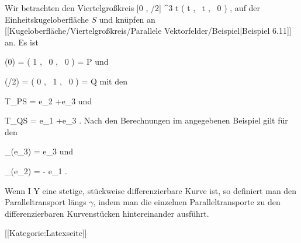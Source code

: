 {

Wir betrachten den Viertelgroßkreis
\maabbeledisp {} {[0 , \pi/2] } { \R^3
} { t } { \left(  \cos  t   , \,   \sin  t  , \,   0                 \right)
} {,}
auf der Einheitskugeloberfläche $S$ und knüpfen an
[[Kugeloberfläche/Viertelgroßkreis/Parallele Vektorfelder/Beispiel|Beispiel 6.11]]
an. Es ist

\mavergleichskette
{\vergleichskette
{ \gamma(0)
}
{ = }{ \left(  1   , \,   0  , \,   0                 \right)
}
{ = }{ P
}
{    }{
}
{   }{
}
}
{}{}{}
und

\mavergleichskette
{\vergleichskette
{ \gamma(\pi/2)
}
{ = }{ \left(  0   , \,   1  , \,   0                 \right)
}
{ = }{ Q
}
{    }{
}
{   }{
}
}
{}{}{}
mit den

\mavergleichskette
{\vergleichskette
{ T_PS
}
{ = }{ \R e_2 +\R e_3
}
{  }{
}
{    }{
}
{   }{
}
}
{}{}{}
und

\mavergleichskette
{\vergleichskette
{ T_QS
}
{ = }{ \R e_1 +\R e_3
}
{  }{
}
{    }{
}
{   }{
}
}
{}{}{.}
Nach den Berechnungen im angegebenen Beispiel gilt für den

\mavergleichskette
{\vergleichskette
{ \Psi_\gamma(e_3)
}
{ = }{ e_3
}
{  }{
}
{    }{
}
{   }{
}
}
{}{}{}
und

\mavergleichskette
{\vergleichskette
{ \Psi_\gamma(e_2)
}
{ = }{ - e_1
}
{  }{
}
{    }{
}
{   }{
}
}
{}{}{.}

}

Wenn
\maabbdisp {\gamma} { I } { Y
} {}
eine stetige, stückweise differenzierbare Kurve ist, so definiert man den Paralleltransport längs $\gamma$, indem man die einzelnen Paralleltransporte zu den differenzierbaren Kurvenstücken hintereinander ausführt.

 [[Kategorie:Latexseite]]
